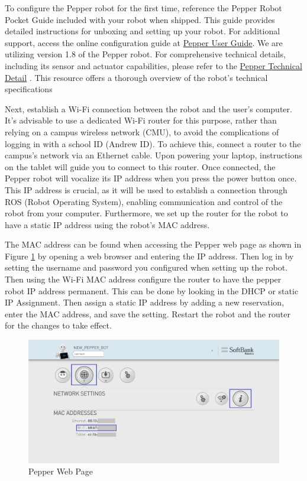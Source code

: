 \documentclass{CSSRforAfrica}
\begin{document}
{\label{setup_pepper}
To configure the Pepper robot for the first time, reference the Pepper Robot Pocket Guide included with your robot when shipped. This guide provides detailed instructions for unboxing and setting up your robot. For additional support, access the online configuration guide at \href{http://doc.aldebaran.com/2-5/family/pepper_user_guide/first_conf_pep.html}{Pepper User Guide}. We are utilizing version 1.8 of the Pepper robot. For comprehensive technical details, including its sensor and actuator capabilities, please refer to the 
\href{http://doc.aldebaran.com/2-5/family/pepper_technical/index_pep.html}{Pepper Technical Detail} \cite{SoftBankDocumentation}. This resource offers a thorough overview of the robot's technical specifications

Next, establish a Wi-Fi connection between the robot and the user's computer. It's advisable to use a dedicated Wi-Fi router for this purpose, rather than relying on a campus wireless network (CMU), to avoid the complications of logging in with a school ID (Andrew ID). To achieve this, connect a router to the campus's network via an Ethernet cable. Upon powering your laptop, instructions on the tablet will guide you to connect to this router. Once connected, the Pepper robot will vocalize its IP address when you press the power button once. This IP address is crucial, as it will be used to establish a connection through ROS (Robot Operating System), enabling communication and control of the robot from your computer. Furthermore, we set up the router for the robot to have a static IP address using the robot's MAC address. 

The MAC address can be found when accessing the Pepper web page as shown in Figure \ref{fig:pepper-web-page} by opening a web browser and entering the IP address. Then log in by setting the username and password you configured when setting up the robot. Then using the Wi-Fi MAC address configure the router to have the pepper robot IP address permanent. This can be done by looking in the DHCP or static IP Assignment. Then assign a static IP address by adding a new reservation, enter the MAC  address, and save the setting. Restart the robot and the router for the changes to take effect.

\begin{figure}[!hbpt]
\centering
\includegraphics[scale=0.30]{images/Pepper-Web-page.png}
\caption{Pepper Web Page}
\label{fig:pepper-web-page}
\end{figure}
}
\end{document}
